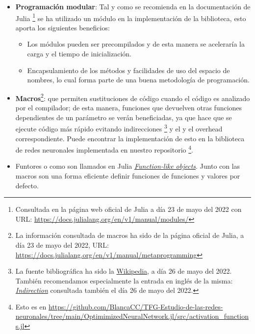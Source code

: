 
\begin{itemize}
    \item \textbf{Programación modular}: Tal y como se recomienda en la documentación de Julia \footnote{
        Consultada en la página web oficial de Julia  a día 23 de mayo del 2022 con URL: \url{https://docs.julialang.org/en/v1/manual/modules/}
    } se ha utilizado un módulo en la implementación de la biblioteca, esto aporta los siguientes beneficios: 
    \begin{itemize}
        \item Los módulos pueden ser precompilados y de esta manera se aceleraría la carga y el tiempo de inicialización. 
        \item Encapsulamiento de los métodos y facilidades de uso del espacio de nombres, lo cual forma parte
        de una buena metodología de programación. 
    \end{itemize}

    \item \textbf{Macros}\footnote{La información consultada de macros ha sido  de la página oficial de Julia, a día 23 de mayo del 2022, URL:
    \url{https://docs.julialang.org/en/v1/manual/metaprogramming}}:
    que permiten sustituciones de código cuando el código es analizado por el compilador; 
    de esta manera, funciones que devuelven otras funciones dependientes de un parámetro se verán beneficiadas,
    ya que hace que se ejecute código más rápido evitando indirecciones \footnote{La fuente bibliográfica ha sido la \href{https://es.wikipedia.org/wiki/Indirección}{Wikipedia}, a día 26 de mayo del 2022.
    También recomendamos especialmente la entrada en inglés de la misma:
    \href{https://en.wikipedia.org/wiki/Indirection}{\textit{Indirection}}
    consultada también el día 26 de mayo del 2022.
    }  y el y el overhead correspondiente. 
     Puede encontrar la implementación de esto en la biblioteca de redes neuronales implementada en nuestro 
     repositorio 
     \footnote{
         Esto es en \url{https://github.com/BlancaCC/TFG-Estudio-de-las-redes-neuronales/tree/main/OptimimizedNeuralNetwork.jl/src/activation_functions.jl}
     }.

     \item Funtores o como son llamados en Julia \href{https://docs.julialang.org/en/v1/manual/methods/#Function-like-objects}{\textit{Function-like objects}}. Junto con las macros son una forma eficiente definir funciones de funciones y valores por defecto. 
\end{itemize}

